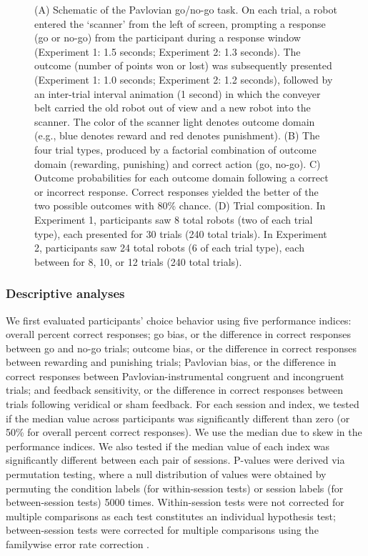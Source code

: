 \documentclass[a4paper,12pt]{article}
\begin{document}
\begin{refsection}[main]
\begin{figure}[t]
    \centerline{}
    \caption{(A) Schematic of the Pavlovian go/no-go task. On each trial, a robot entered the `scanner' from the left of screen, prompting a response (go or no-go) from the participant during a response window (Experiment 1: 1.5 seconds; Experiment 2: 1.3 seconds). The outcome (number of points won or lost) was subsequently presented (Experiment 1: 1.0 seconds; Experiment 2: 1.2 seconds), followed by an inter-trial interval animation (1 second) in which the conveyer belt carried the old robot out of view and a new robot into the scanner. The color of the scanner light denotes outcome domain (e.g., blue denotes reward and red denotes punishment). (B) The four trial types, produced by a factorial combination of outcome domain (rewarding, punishing) and correct action (go, no-go). C) Outcome probabilities for each outcome domain following a correct or incorrect response. Correct responses yielded the better of the two possible outcomes with 80\% chance. (D) Trial composition. In Experiment 1, participants saw 8 total robots (two of each trial type), each presented for 30 trials (240 total trials). In Experiment 2, participants saw 24 total robots (6 of each trial type), each between for 8, 10, or 12 trials (240 total trials).}
    \label{fig:task_schematic}
\end{figure}

\subsubsection*{Descriptive analyses}

We first evaluated participants' choice behavior using five performance indices: overall percent correct responses; go bias, or the difference in correct responses between go and no-go trials; outcome bias, or the difference in correct responses between rewarding and punishing trials; Pavlovian bias, or the difference in correct responses between Pavlovian-instrumental congruent and incongruent trials; and feedback sensitivity, or the difference in correct responses between trials following veridical or sham feedback. For each session and index, we tested if the median value across participants was significantly different than zero (or 50\% for overall percent correct responses). We use the median due to skew in the performance indices. We also tested if the median value of each index was significantly different between each pair of sessions. P-values were derived via permutation testing, where a null distribution of values were obtained by permuting the condition labels (for within-session tests) or session labels (for between-session tests) 5000 times. Within-session tests were not corrected for multiple comparisons as each test constitutes an individual hypothesis test; between-session tests were corrected for multiple comparisons using the familywise error rate correction \cite{winkler2014permutation}.


\end{refsection}
\end{document}
